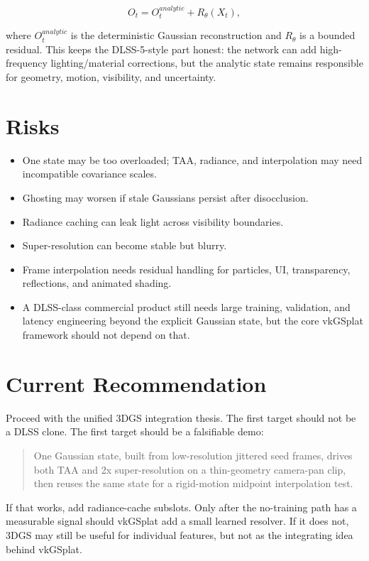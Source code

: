 \documentclass[11pt]{article}
\begin{document}
\[
  O_t = O_t^{analytic} + R_\theta(X_t),
\]

where $O_t^{analytic}$ is the deterministic Gaussian reconstruction and
$R_\theta$ is a bounded residual. This keeps the DLSS-5-style part honest: the
network can add high-frequency lighting/material corrections, but the analytic
state remains responsible for geometry, motion, visibility, and uncertainty.

\section{Risks}

\begin{itemize}
  \item One state may be too overloaded; TAA, radiance, and interpolation may
        need incompatible covariance scales.
  \item Ghosting may worsen if stale Gaussians persist after disocclusion.
  \item Radiance caching can leak light across visibility boundaries.
  \item Super-resolution can become stable but blurry.
  \item Frame interpolation needs residual handling for particles, UI,
        transparency, reflections, and animated shading.
  \item A DLSS-class commercial product still needs large training,
        validation, and latency engineering beyond the explicit Gaussian
        state, but the core vkGSplat framework should not depend on that.
\end{itemize}

\section{Current Recommendation}

Proceed with the unified 3DGS integration thesis. The first target should not
be a DLSS clone. The first target should be a falsifiable demo:

\begin{quote}
One Gaussian state, built from low-resolution jittered seed frames, drives both
TAA and 2x super-resolution on a thin-geometry camera-pan clip, then reuses the
same state for a rigid-motion midpoint interpolation test.
\end{quote}

If that works, add radiance-cache subslots. Only after the no-training path has
a measurable signal should vkGSplat add a small learned resolver. If it does
not, 3DGS may still be useful for individual features, but not as the
integrating idea behind vkGSplat.
\end{document}
